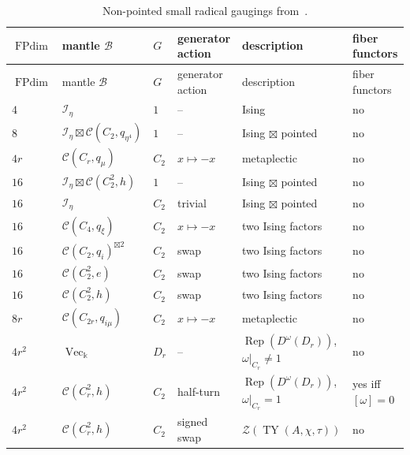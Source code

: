 \documentclass[12pt]{amsart}
\theoremstyle{plain}
\theoremstyle{definition} %
\theoremstyle{remark} %
\newcommand{\ku}{{\Bbbk}} %
\DeclareMathOperator{\VecCat}{Vec}
\newcommand{\cC}{\mathcal{C}}
\newcommand{\cB}{\mathcal{B}}
\newcommand{\TY}{\operatorname{TY}}
\newcommand{\FPdim}{\operatorname{FPdim}}
\newcommand{\Rep}{\operatorname{Rep}}
\begin{document}
\begingroup
\footnotesize
\setlength{\tabcolsep}{2.2pt}
\renewcommand{\arraystretch}{1.16}
\begin{longtable}{|>{\raggedright\arraybackslash}p{1.05cm}|>{\raggedright\arraybackslash}p{2.45cm}|>{\centering\arraybackslash}p{0.65cm}|>{\raggedright\arraybackslash}p{2.0cm}|>{\raggedright\arraybackslash}p{3.25cm}|>{\raggedright\arraybackslash}p{2.35cm}|}
\caption{Non-pointed small radical gaugings from~\cite[Table~3]{GNradical}.}
\label{tab:small_radical_gaugings}\\
\hline
\(\FPdim\) & mantle \(\cB\) & \(G\) & generator action & description & fiber functors \\
\hline
\endfirsthead
\hline
\(\FPdim\) & mantle \(\cB\) & \(G\) & generator action & description & fiber functors \\
\hline
\endhead
\(4\) & \(\mathcal I_\eta\) & \(1\) & -- & Ising & no \\
\hline
\(8\) & \(\mathcal I_\eta\boxtimes\cC(C_2,q_{\eta^4})\) & \(1\) & -- & Ising \(\boxtimes\) pointed & no \\
\hline
\(4r\) & \(\cC(C_r,q_\mu)\) & \(C_2\) & \(x\mapsto-x\) & metaplectic & no \\
\hline
\(16\) & \(\mathcal I_\eta\boxtimes\cC(C_2^2,h)\) & \(1\) & -- & Ising \(\boxtimes\) pointed & no \\
\hline
\(16\) & \(\mathcal I_\eta\) & \(C_2\) & trivial & Ising \(\boxtimes\) pointed & no \\
\hline
\(16\) & \(\cC(C_4,q_\xi)\) & \(C_2\) & \(x\mapsto-x\) & two Ising factors & no \\
\hline
\(16\) & \(\cC(C_2,q_i)^{\boxtimes2}\) & \(C_2\) & swap & two Ising factors & no \\
\hline
\(16\) & \(\cC(C_2^2,e)\) & \(C_2\) & swap & two Ising factors & no \\
\hline
\(16\) & \(\cC(C_2^2,h)\) & \(C_2\) & swap & two Ising factors & no \\
\hline
\(8r\) & \(\cC(C_{2r},q_{i\mu})\) & \(C_2\) & \(x\mapsto-x\) & metaplectic & no \\
\hline
\(4r^2\) & \(\VecCat_\ku\) & \(D_r\) & -- & \(\Rep(D^\omega(D_r))\), \(\omega|_{C_r}\ne1\) & no \\
\hline
\(4r^2\) & \(\cC(C_r^2,h)\) & \(C_2\) & half-turn & \(\Rep(D^\omega(D_r))\), \(\omega|_{C_r}=1\) & yes iff \([\omega]=0\) \\
\hline
\(4r^2\) & \(\cC(C_r^2,h)\) & \(C_2\) & signed swap & \(\mathcal Z(\TY(A,\chi,\tau))\) & no \\
\hline

\end{longtable}
\end{document}
